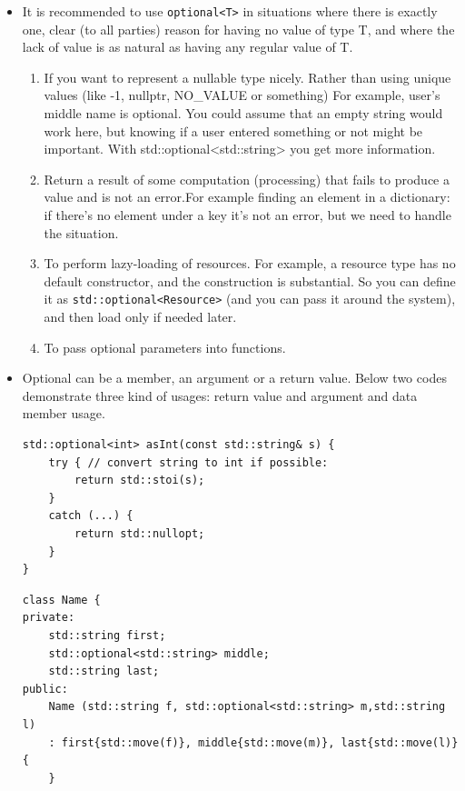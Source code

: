 \documentclass[a4paper,11pt,twoside]{book}
\begin{document}
\begin{itemize}
	\item It is recommended to use \texttt{optional<T>} in situations where there is exactly one, clear (to all parties) reason for having no value of type T, and where the lack of value is as natural as having any regular value of T. 
	
	\begin{enumerate}
		\item  If you want to represent a nullable type nicely. Rather than using unique values (like -1, nullptr, NO\_VALUE or something) For example, user’s middle name is optional. You could assume that an empty string would work here, but knowing if a user entered something or not might be important. With std::optional<std::string> you get more information.
		
		\item Return a result of some computation (processing) that fails to produce a value and is not an error.For example finding an element in a dictionary: if there’s no element under a key it’s not an error, but we need to handle the situation.
		
		\item To perform lazy-loading of resources. For example, a resource type has no default constructor, and the construction is substantial. So you can define it as \texttt{std::optional<Resource>} (and you can pass it around the system), and then load only if needed later.
		
		\item To pass optional parameters into functions.
	\end{enumerate}
	
	\item Optional can be a member, an argument or a return value. Below two codes demonstrate three kind of usages: return value and argument and data member usage. 
	
\begin{lstlisting}
std::optional<int> asInt(const std::string& s) { 
	try { // convert string to int if possible:
		return std::stoi(s);
	}
	catch (...) {
		return std::nullopt;
	}
}	
\end{lstlisting}	

\begin{lstlisting}
class Name {
private:
	std::string first;
	std::optional<std::string> middle;
	std::string last;
public:
	Name (std::string f, std::optional<std::string> m,std::string l)
	: first{std::move(f)}, middle{std::move(m)}, last{std::move(l)} {
	}


\end{lstlisting}
\end{itemize}
\end{document}
